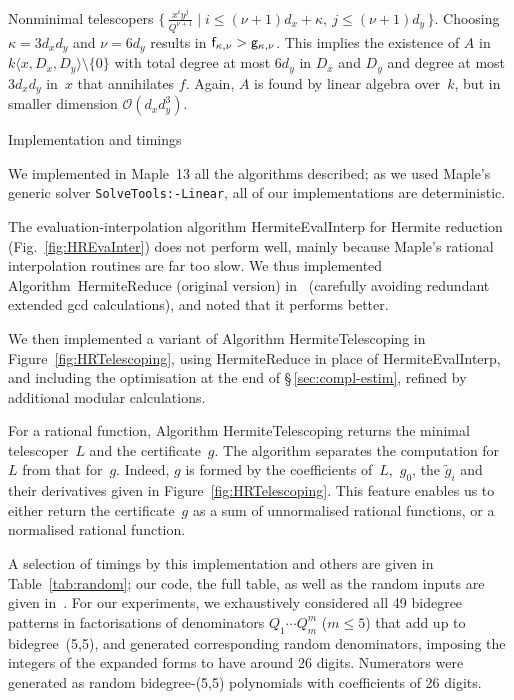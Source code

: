 \documentclass{sig-alt-full}
\newcommand{\bigO}{{\mathcal{O}}}
\begin{document}
\begin{section}{Nonminimal telescopers}
\noindent
$\bigl\{\,\frac{x^i y^j}{Q^{\nu+1}} \mid i \le (\nu+1) d_x+\kappa, \ j \le (\nu+1) d_y\,\bigr\}$.
Choosing $\kappa=3d_xd_y$ and $\nu=6d_y$ results in ${\sf f}_{\kappa,\nu} > {\sf g}_{\kappa,\nu}$.
This implies the existence of $A$ in $k\langle x, D_x, D_y\rangle
\setminus \{0\}$ with total degree at most $6d_y$ in $D_x$ and $D_y$
and degree at most $3d_x d_y$ in~$x$ that annihilates $f$.
Again, $A$ is found by linear algebra over~$k$, but in smaller dimension
$\bigO(d_x d_y^3)$.

\end{section}

\begin{section}{Implementation and timings}\label{sec:implementation}

We implemented in Maple~13 all the algorithms described;
as we used Maple's generic solver \verb+SolveTools:-Linear+,
all of our implementations are deterministic.

The evaluation-interpolation algorithm \textsf{HermiteEvalInterp}
for Hermite reduction (Fig.~\ref{fig:HREvaInter}) does not
perform well, mainly because Maple's rational interpolation routines
are far too slow.
We thus implemented Algorithm~\textsf{HermiteReduce} (original
version) in~\cite[\S\,2.2]{BronsteinBook} (carefully avoiding
redundant extended gcd calculations), and noted that it performs
better.

We then implemented a variant of Algorithm \textsf{HermiteTelescoping}
in Figure~\ref{fig:HRTelescoping}, using \textsf{HermiteReduce} in
place of \textsf{HermiteEvalInterp}, and including the optimisation at
the end of \S\,\ref{sec:compl-estim},
refined by additional modular calculations.

For a rational function,
Algorithm \textsf{HermiteTelescoping} returns the minimal telescoper~$L$ and the certificate~$g$.
The algorithm separates the computation for~$L$
from that for~$g$.  Indeed, $g$ is formed by
the coefficients of~$L$,~$g_0$, the $\tilde g_i$ and their derivatives given in Figure~\ref{fig:HRTelescoping}.
This feature enables us to either return the certificate~$g$ as a sum of unnormalised rational functions,
or a normalised rational function.

A selection of timings by this implementation and others are given in
Table~\ref{tab:random};
our code, the full table, as well as the random inputs
are given in~\cite{OurSoft}.
For our experiments, we exhaustively
considered all 49 bidegree patterns in factorisations of denominators
$Q_1\cdots Q_m^m$ ($m\le5$) that add up to bidegree~(5,5), and
generated corresponding random denominators, imposing the
integers of the expanded forms to have around 26 digits.
Numerators were generated as random bidegree-(5,5) polynomials with
coefficients of 26 digits.


\end{section}
\end{document}
